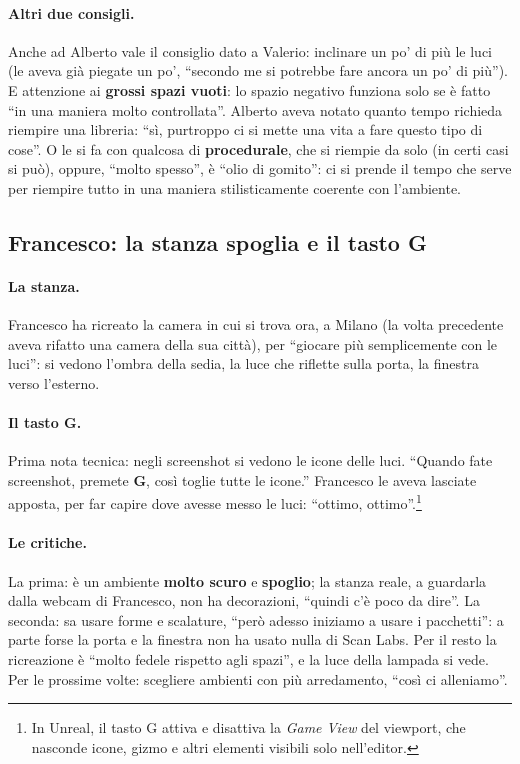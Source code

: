 \paragraph{Altri due consigli.} Anche ad Alberto vale il consiglio dato a Valerio:
inclinare un po' di più le luci (le aveva già piegate un po', ``secondo me si potrebbe
fare ancora un po' di più''). E attenzione ai \textbf{grossi spazi vuoti}: lo spazio
negativo funziona solo se è fatto ``in una maniera molto controllata''. Alberto aveva
notato quanto tempo richieda riempire una libreria: ``sì, purtroppo ci si mette una
vita a fare questo tipo di cose''. O le si fa con qualcosa di \textbf{procedurale}, che
si riempie da solo (in certi casi si può), oppure, ``molto spesso'', è ``olio di
gomito'': ci si prende il tempo che serve per riempire tutto in una maniera
stilisticamente coerente con l'ambiente.

\subsection{Francesco: la stanza spoglia e il tasto G}

\paragraph{La stanza.} Francesco ha ricreato la camera in cui si trova ora, a Milano
(la volta precedente aveva rifatto una camera della sua città), per ``giocare più
semplicemente con le luci'': si vedono l'ombra della sedia, la luce che riflette sulla
porta, la finestra verso l'esterno.

\paragraph{Il tasto G.} Prima nota tecnica: negli screenshot si vedono le icone delle
luci. ``Quando fate screenshot, premete \textbf{G}, così toglie tutte le icone.''
Francesco le aveva lasciate apposta, per far capire dove avesse messo le luci: ``ottimo,
ottimo''.\footnote{In Unreal, il tasto G attiva e disattiva la \emph{Game View} del
viewport, che nasconde icone, gizmo e altri elementi visibili solo nell'editor.}

\paragraph{Le critiche.} La prima: è un ambiente \textbf{molto scuro} e
\textbf{spoglio}; la stanza reale, a guardarla dalla webcam di Francesco, non ha
decorazioni, ``quindi c'è poco da dire''. La seconda: sa usare forme e scalature,
``però adesso iniziamo a usare i pacchetti'': a parte forse la porta e la finestra non
ha usato nulla di Scan Labs. Per il resto la ricreazione è ``molto fedele rispetto agli
spazi'', e la luce della lampada si vede. Per le prossime volte: scegliere ambienti con
più arredamento, ``così ci alleniamo''.

